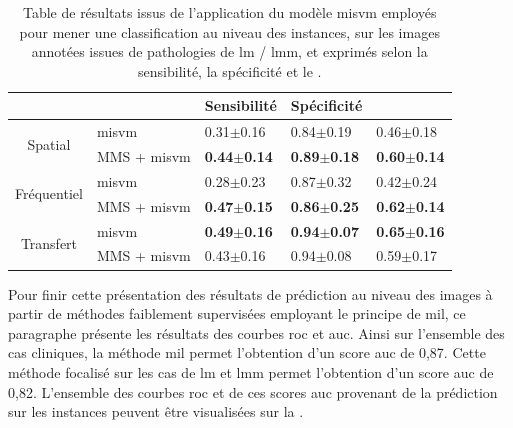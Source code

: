 \begin{table}[H]
    \centering
    \begin{tabular}{cllll}
        \toprule
        \multicolumn{1}{l}{}         &                      & Sensibilité           & Spécificité           & \fscore{}             \\ \midrule
        \multirow{2}{*}{Spatial}     & \gls{misvm}          & 0.31$\pm$0.16             & 0.84$\pm$0.19             & 0.46$\pm$0.18             \\
                                     & MMS + \gls{misvm}    & \textbf{0.44$\pm$0.14}    & \textbf{0.89$\pm$0.18}    & \textbf{0.60$\pm$0.14}    \\ \midrule
        \multirow{2}{*}{Fréquentiel} & \gls{misvm}          & 0.28$\pm$0.23             & 0.87$\pm$0.32             & 0.42$\pm$0.24             \\
                                     & MMS + \gls{misvm}    & \textbf{0.47$\pm$0.15}    & \textbf{0.86$\pm$0.25}    & \textbf{0.62$\pm$0.14}    \\ \midrule
        \multirow{2}{*}{Transfert}   & \gls{misvm}          & \textbf{0.49$\pm$0.16}    & \textbf{0.94$\pm$0.07}    & \textbf{0.65$\pm$0.16}    \\
                                     & MMS + \gls{misvm}    & 0.43$\pm$0.16             & 0.94$\pm$0.08             & 0.59$\pm$0.17             \\ \bottomrule
    \end{tabular}
    \caption{Table de résultats issus de l'application du modèle \gls{misvm} employés pour mener une classification au niveau des instances, sur les images annotées issues de pathologies de \gls{lm} / \gls{lmm}, et exprimés selon la sensibilité, la spécificité et le \fscore{}.}
    \label{tab:results_lesion_classification_weakly_image_lm}
\end{table}

Pour finir cette présentation des résultats de prédiction au niveau des images à partir de méthodes faiblement supervisées employant le principe de \gls{mil}, ce paragraphe présente les résultats des courbes \gls{roc} et \gls{auc}. Ainsi sur l'ensemble des cas cliniques, la méthode \gls{mil} permet l'obtention d'un score \gls{auc} de 0,87. Cette méthode focalisé sur les cas de \gls{lm} et \gls{lmm} permet l'obtention d'un score \gls{auc} de 0,82. L'ensemble des courbes \gls{roc} et de ces scores \gls{auc} provenant de la prédiction sur les instances peuvent être visualisées sur la .\par

